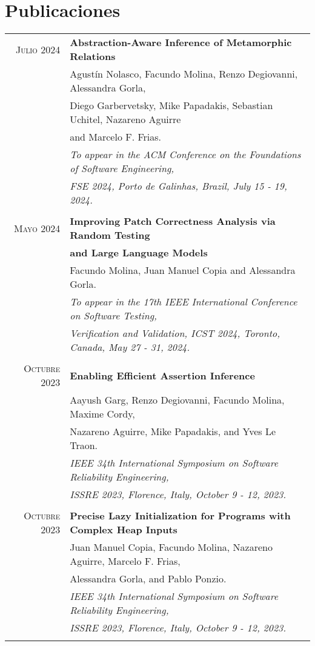 \documentclass[a4paper,10pt]{article} %
\begin{document}
\section{Publicaciones}
\begin{longtable}{rl}

\textsc{Julio} 2024  & \textbf{Abstraction-Aware Inference of Metamorphic Relations} \\
        & Agustín Nolasco, Facundo Molina, Renzo Degiovanni, Alessandra Gorla, \\ 
        & Diego Garbervetsky, Mike Papadakis, Sebastian Uchitel, Nazareno Aguirre \\
        & and Marcelo F. Frias. \\
        & \textit{To appear in the ACM Conference on the Foundations of Software Engineering,} \\
        & \textit{FSE 2024, Porto de Galinhas, Brazil, July 15 - 19, 2024.} \\ & \\

\textsc{Mayo} 2024  & \textbf{Improving Patch Correctness Analysis via Random Testing} \\
        & \textbf{and Large Language Models} \\
        & Facundo Molina, Juan Manuel Copia and Alessandra Gorla. \\
        & \textit{To appear in the 17th IEEE International Conference on Software Testing,} \\
        & \textit{Verification and Validation, ICST 2024, Toronto, Canada, May 27 - 31, 2024.} \\ & \\

\textsc{Octubre} 2023  & \textbf{Enabling Efficient Assertion Inference} \\
        & Aayush Garg, Renzo Degiovanni, Facundo Molina, Maxime Cordy,\\
        & Nazareno Aguirre, Mike Papadakis, and Yves Le Traon. \\
        & \textit{IEEE 34th International Symposium on Software Reliability Engineering,} \\
        & \textit{ISSRE 2023, Florence, Italy, October 9 - 12, 2023.} \\ & \\

\textsc{Octubre} 2023  & \textbf{Precise Lazy Initialization for Programs with Complex Heap Inputs} \\
        & Juan Manuel Copia, Facundo Molina, Nazareno Aguirre, Marcelo F. Frias,\\
        & Alessandra Gorla, and Pablo Ponzio. \\
        & \textit{IEEE 34th International Symposium on Software Reliability Engineering,} \\
        & \textit{ISSRE 2023, Florence, Italy, October 9 - 12, 2023.} \\ & \\


\end{longtable}
\end{document}
